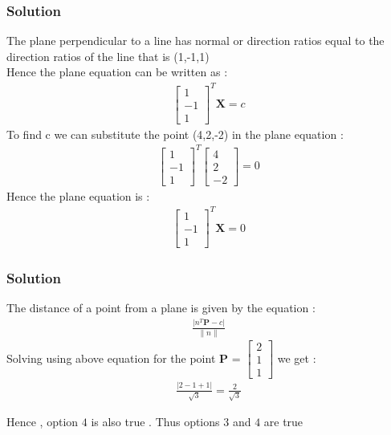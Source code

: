 \documentclass{beamer}
\begin{document}
\begin{frame}
\frametitle{Solution}
The plane perpendicular to a line has normal or direction ratios equal to the direction ratios of the line that is (1,-1,1)\\
Hence the plane equation can be written as :
\begin{align}
    \begin{bmatrix}1\\-1\\1\end{bmatrix}^T\textbf{X} = c
\end{align}
To find c we can substitute the point (4,2,-2) in the plane equation :
\begin{align}
    \begin{bmatrix}1\\-1\\1\end{bmatrix}^T\begin{bmatrix}4\\2\\-2\end{bmatrix} = 0
\end{align}
Hence the plane equation is :
\begin{align}
    \begin{bmatrix}1\\-1\\1\end{bmatrix}^T\textbf{X} = 0
\end{align}
\end{frame}

\begin{frame}
\frametitle{Solution}
The distance of a point from a plane is given by the equation :
\begin{align}
    \frac{\lvert n^{T}\textbf{P} - c \rvert}{\lVert n \rVert}
\end{align}
Solving using above equation for the point \textbf{P} = $\begin{bmatrix}2\\1\\1\end{bmatrix}$ we get :
 \begin{align}
      \frac{\lvert 2 - 1 +1 \rvert}{\sqrt{3}} = \frac{2}{\sqrt{3}}
 \end{align}

Hence , option $4$ is also true .
Thus options $3$ and $4$ are true 
\end{frame}
\end{document}
